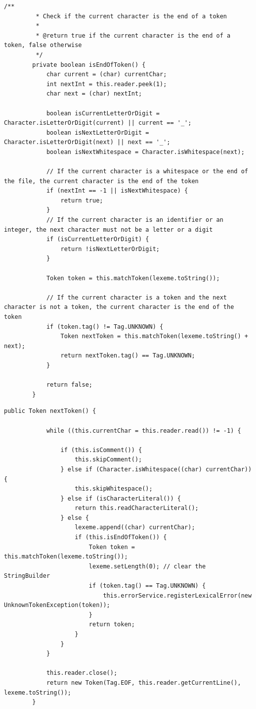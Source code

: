 \documentclass[french,a4paper]{article}
\begin{document}
    \begin{lstlisting}[label={lst:lstlisting1}]
        /**
         * Check if the current character is the end of a token
         *
         * @return true if the current character is the end of a token, false otherwise
         */
        private boolean isEndOfToken() {
            char current = (char) currentChar;
            int nextInt = this.reader.peek(1);
            char next = (char) nextInt;

            boolean isCurrentLetterOrDigit = Character.isLetterOrDigit(current) || current == '_';
            boolean isNextLetterOrDigit = Character.isLetterOrDigit(next) || next == '_';
            boolean isNextWhitespace = Character.isWhitespace(next);

            // If the current character is a whitespace or the end of the file, the current character is the end of the token
            if (nextInt == -1 || isNextWhitespace) {
                return true;
            }
            // If the current character is an identifier or an integer, the next character must not be a letter or a digit
            if (isCurrentLetterOrDigit) {
                return !isNextLetterOrDigit;
            }

            Token token = this.matchToken(lexeme.toString());

            // If the current character is a token and the next character is not a token, the current character is the end of the token
            if (token.tag() != Tag.UNKNOWN) {
                Token nextToken = this.matchToken(lexeme.toString() + next);
                return nextToken.tag() == Tag.UNKNOWN;
            }

            return false;
        }
    \end{lstlisting}

    \begin{lstlisting}[label={lst:lstlisting12}]
        public Token nextToken() {

            while ((this.currentChar = this.reader.read()) != -1) {

                if (this.isComment()) {
                    this.skipComment();
                } else if (Character.isWhitespace((char) currentChar)) {
                    this.skipWhitespace();
                } else if (isCharacterLiteral()) {
                    return this.readCharacterLiteral();
                } else {
                    lexeme.append((char) currentChar);
                    if (this.isEndOfToken()) {
                        Token token = this.matchToken(lexeme.toString());
                        lexeme.setLength(0); // clear the StringBuilder
                        if (token.tag() == Tag.UNKNOWN) {
                            this.errorService.registerLexicalError(new UnknownTokenException(token));
                        }
                        return token;
                    }
                }
            }

            this.reader.close();
            return new Token(Tag.EOF, this.reader.getCurrentLine(), lexeme.toString());
        }
    \end{lstlisting}
\end{document}
